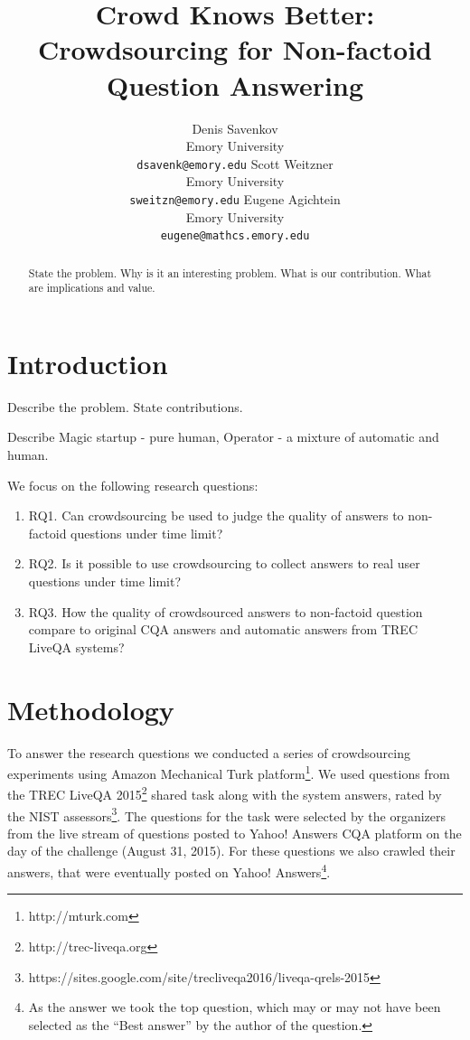 \documentclass[11pt,letterpaper]{article}
\title{Crowd Knows Better: Crowdsourcing for Non-factoid Question Answering}
\author{Denis Savenkov \\ Emory University \\ {\tt dsavenk@emory.edu} 
  \And Scott Weitzner \\ Emory University \\ {\tt sweitzn@emory.edu}
  \And Eugene Agichtein \\ Emory University \\ {\tt eugene@mathcs.emory.edu}
}
\date{}
\begin{document}
\maketitle

\begin{abstract}
State the problem.
Why is it an interesting problem.
What is our contribution.
What are implications and value.
\end{abstract}

\section{Introduction}
\label{sec:introduction}

Describe the problem.
State contributions.

Describe Magic startup - pure human, Operator - a mixture of automatic and human.

We focus on the following research questions:
\begin{enumerate}
\item RQ1. Can crowdsourcing be used to judge the quality of answers to non-factoid questions under time limit?
\item RQ2. Is it possible to use crowdsourcing to collect answers to real user questions under time limit?
\item RQ3. How the quality of crowdsourced answers to non-factoid question compare to original CQA answers and automatic answers from TREC LiveQA systems?
\end{enumerate}


\section{Methodology}
\label{sec:methodology}

To answer the research questions we conducted a series of crowdsourcing experiments using Amazon Mechanical Turk platform\footnote{http://mturk.com}.
We used questions from the TREC LiveQA 2015\footnote{http://trec-liveqa.org} shared task along with the system answers, rated by the NIST assessors\footnote{https://sites.google.com/site/trecliveqa2016/liveqa-qrels-2015}.
The questions for the task were selected by the organizers from the live stream of questions posted to Yahoo! Answers CQA platform on the day of the challenge (August 31, 2015).
For these questions we also crawled their answers, that were eventually posted on Yahoo! Answers\footnote{As the answer we took the top question, which may or may not have been selected as the ``Best answer'' by the author of the question.}.
\end{document}
